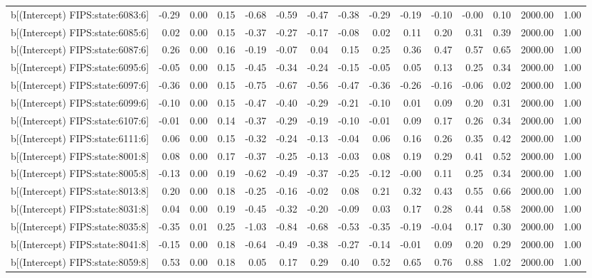 \begin{table}[ht]
\begin{tabular}{rrrrrrrrrrrrrrr}
  b[(Intercept) FIPS:state:6083:6] & -0.29 & 0.00 & 0.15 & -0.68 & -0.59 & -0.47 & -0.38 & -0.29 & -0.19 & -0.10 & -0.00 & 0.10 & 2000.00 & 1.00 \\ 
  b[(Intercept) FIPS:state:6085:6] & 0.02 & 0.00 & 0.15 & -0.37 & -0.27 & -0.17 & -0.08 & 0.02 & 0.11 & 0.20 & 0.31 & 0.39 & 2000.00 & 1.00 \\ 
  b[(Intercept) FIPS:state:6087:6] & 0.26 & 0.00 & 0.16 & -0.19 & -0.07 & 0.04 & 0.15 & 0.25 & 0.36 & 0.47 & 0.57 & 0.65 & 2000.00 & 1.00 \\ 
  b[(Intercept) FIPS:state:6095:6] & -0.05 & 0.00 & 0.15 & -0.45 & -0.34 & -0.24 & -0.15 & -0.05 & 0.05 & 0.13 & 0.25 & 0.34 & 2000.00 & 1.00 \\ 
  b[(Intercept) FIPS:state:6097:6] & -0.36 & 0.00 & 0.15 & -0.75 & -0.67 & -0.56 & -0.47 & -0.36 & -0.26 & -0.16 & -0.06 & 0.02 & 2000.00 & 1.00 \\ 
  b[(Intercept) FIPS:state:6099:6] & -0.10 & 0.00 & 0.15 & -0.47 & -0.40 & -0.29 & -0.21 & -0.10 & 0.01 & 0.09 & 0.20 & 0.31 & 2000.00 & 1.00 \\ 
  b[(Intercept) FIPS:state:6107:6] & -0.01 & 0.00 & 0.14 & -0.37 & -0.29 & -0.19 & -0.10 & -0.01 & 0.09 & 0.17 & 0.26 & 0.34 & 2000.00 & 1.00 \\ 
  b[(Intercept) FIPS:state:6111:6] & 0.06 & 0.00 & 0.15 & -0.32 & -0.24 & -0.13 & -0.04 & 0.06 & 0.16 & 0.26 & 0.35 & 0.42 & 2000.00 & 1.00 \\ 
  b[(Intercept) FIPS:state:8001:8] & 0.08 & 0.00 & 0.17 & -0.37 & -0.25 & -0.13 & -0.03 & 0.08 & 0.19 & 0.29 & 0.41 & 0.52 & 2000.00 & 1.00 \\ 
  b[(Intercept) FIPS:state:8005:8] & -0.13 & 0.00 & 0.19 & -0.62 & -0.49 & -0.37 & -0.25 & -0.12 & -0.00 & 0.11 & 0.25 & 0.34 & 2000.00 & 1.00 \\ 
  b[(Intercept) FIPS:state:8013:8] & 0.20 & 0.00 & 0.18 & -0.25 & -0.16 & -0.02 & 0.08 & 0.21 & 0.32 & 0.43 & 0.55 & 0.66 & 2000.00 & 1.00 \\ 
  b[(Intercept) FIPS:state:8031:8] & 0.04 & 0.00 & 0.19 & -0.45 & -0.32 & -0.20 & -0.09 & 0.03 & 0.17 & 0.28 & 0.44 & 0.58 & 2000.00 & 1.00 \\ 
  b[(Intercept) FIPS:state:8035:8] & -0.35 & 0.01 & 0.25 & -1.03 & -0.84 & -0.68 & -0.53 & -0.35 & -0.19 & -0.04 & 0.17 & 0.30 & 2000.00 & 1.00 \\ 
  b[(Intercept) FIPS:state:8041:8] & -0.15 & 0.00 & 0.18 & -0.64 & -0.49 & -0.38 & -0.27 & -0.14 & -0.01 & 0.09 & 0.20 & 0.29 & 2000.00 & 1.00 \\ 
  b[(Intercept) FIPS:state:8059:8] & 0.53 & 0.00 & 0.18 & 0.05 & 0.17 & 0.29 & 0.40 & 0.52 & 0.65 & 0.76 & 0.88 & 1.02 & 2000.00 & 1.00 \\ 

\end{tabular}
\end{table}
